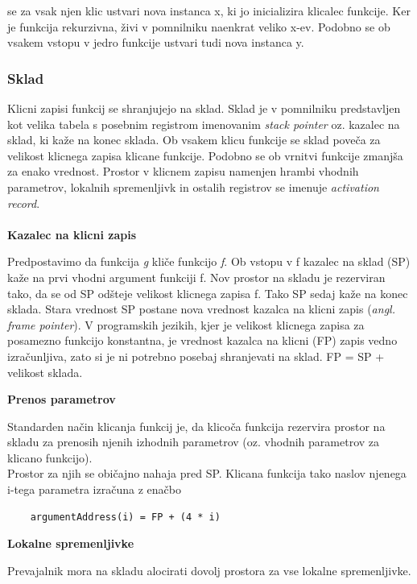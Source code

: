 \documentclass[a4paper, 12pt]{book}
\begin{document}
se za vsak njen klic ustvari nova instanca x, ki jo inicializira klicalec funkcije. Ker je funkcija rekurzivna, živi v pomnilniku naenkrat veliko x-ev. Podobno se ob vsakem vstopu v jedro funkcije ustvari tudi nova instanca y. \cite{modernCompiler}\\

\subsubsection{Sklad}

Klicni zapisi funkcij se shranjujejo na sklad. Sklad je v pomnilniku predstavljen kot velika tabela s posebnim registrom imenovanim \textit{stack pointer} oz. kazalec na sklad, ki kaže na konec sklada. Ob vsakem klicu funkcije se sklad poveča za velikost klicnega zapisa klicane funkcije. Podobno se ob vrnitvi funkcije zmanjša za enako vrednost. Prostor v klicnem zapisu namenjen hrambi vhodnih parametrov, lokalnih spremenljivk in ostalih registrov se imenuje \textit{activation record}. \cite{modernCompiler}
\\\\
\textbf{Kazalec na klicni zapis}

Predpostavimo da funkcija \textit{g} kliče funkcijo \textit{f}. Ob vstopu v f kazalec na sklad (SP) kaže na prvi vhodni argument funkciji f. Nov prostor na skladu je rezerviran tako, da se od SP odšteje velikost klicnega zapisa f. Tako SP sedaj kaže na konec sklada. Stara vrednost SP postane nova vrednost kazalca na klicni zapis (\textit{angl. frame pointer}). V programskih jezikih, kjer je velikost klicnega zapisa za posamezno funkcijo konstantna, je vrednost kazalca na klicni (FP) zapis vedno izračunljiva, zato si je ni potrebno posebaj shranjevati na sklad. FP = SP + velikost sklada. \cite{modernCompiler}

\textbf{Prenos parametrov}

Standarden način klicanja funkcij je, da klicoča funkcija rezervira prostor na skladu za prenosih njenih izhodnih parametrov (oz. vhodnih parametrov za klicano funkcijo). \cite{modernCompiler} \\
\indent Prostor za njih se običajno nahaja pred SP. Klicana funkcija tako naslov njenega i-tega parametra izračuna z enačbo 
\begin{lstlisting}
	argumentAddress(i) = FP + (4 * i)
\end{lstlisting}

\textbf{Lokalne spremenljivke}

Prevajalnik mora na skladu alocirati dovolj prostora za vse lokalne spremenljivke. 
\end{document}
